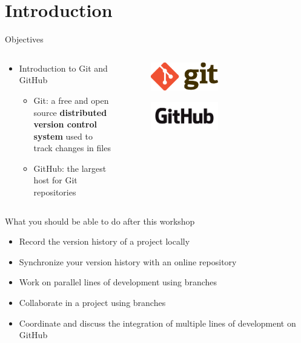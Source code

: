 \documentclass[handout]{beamer}
\begin{document}
\section{Introduction}

\begin{frame}{Objectives}
  \begin{columns}
  
    \begin{column}{0.5\textwidth}
    	\begin{itemize}
			  \item Introduction to Git and GitHub
			  \begin{itemize}
				  \item Git: a free and open source \textbf{distributed version control system} used to track changes in files
				  \item GitHub: the largest host for Git repositories
			  \end{itemize}
		  \end{itemize}
		\end{column}
		
    \begin{column}{0.5\textwidth}
      \begin{figure}
	      \includegraphics[width=0.5\textwidth]{figures/git_logo.eps}
	      \caption{}
      \end{figure}
      \begin{figure}
	      \includegraphics[width=0.5\textwidth]{figures/github_logo.png}
	      \caption{}
      \end{figure}
    \end{column}
  \end{columns}
\end{frame}

\begin{frame}{What you should be able to do after this workshop}
\begin{itemize}
	\item Record the version history of a project locally
	\item Synchronize your version history with an online repository
	\item Work on parallel lines of development using branches
	\item Collaborate in a project using branches
	\item Coordinate and discuss the integration of multiple lines of development on GitHub
\end{itemize}
\end{frame}
\end{document}
